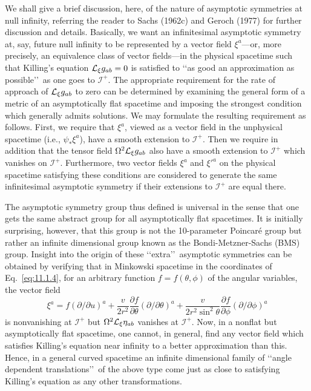 We shall give a brief discussion, here, of the nature of asymptotic symmetries at
null infinity, referring the reader to Sachs (1962c) and Geroch (1977) for further
discussion and details. Basically, we want an infinitesimal asymptotic symmetry at,
say, future null infinity to be represented by a vector field \(\xi^a\)---or, more
precisely, an equivalence class of vector fields---in the physical spacetime such that
Killing's equation \(\mathcal{L}_\xi g_{ab}=0\) is satisfied to \lq\lq as good an
approximation as possible\rq\rq\ as one goes to \(\mathcal I^+\). The appropriate
requirement for the rate of approach of \(\mathcal{L}_\xi g_{ab}\) to zero can be determined
by examining the general form of a metric of an asymptotically flat spacetime and
imposing the strongest condition which generally admits solutions. We may formulate
the resulting requirement as follows. First, we require that \(\xi^a\), viewed as a
vector field in the unphysical spacetime (i.e., \(\psi_*\xi^a\)), have a smooth
extension to \(\mathcal I^+\). Then we require in addition that the tensor field
\(\Omega^2\mathcal{L}_\xi g_{ab}\) also have a smooth extension to \(\mathcal I^+\) which
vanishes on \(\mathcal I^+\). Furthermore, two vector fields \(\xi^a\) and
\(\xi'^a\) on the physical spacetime satisfying these conditions are considered to
generate the same infinitesimal asymptotic symmetry if their extensions to
\(\mathcal I^+\) are equal there.

The asymptotic symmetry group thus defined is universal in the sense that one gets
the same abstract group for all asymptotically flat spacetimes. It is initially
surprising, however, that this group is not the 10-parameter Poincar\'e group but
rather an infinite dimensional group known as the Bondi-Metzner-Sachs (BMS) group.
Insight into the origin of these \lq\lq extra\rq\rq\ asymptotic symmetries can be obtained
by verifying that in Minkowski spacetime in the coordinates of
Eq.~\eqref{eq:11.1.4}, for an arbitrary function \(f=f(\theta,\phi)\) of the angular
variables, the vector field
\begin{equation}
  \xi^a=f(\partial/\partial u)^a
  +\frac{v}{2r^2}\frac{\partial f}{\partial\theta}(\partial/\partial\theta)^a
  +\frac{v}{2r^2\sin^2\theta}
  \frac{\partial f}{\partial\phi}(\partial/\partial\phi)^a
  \tag{11.1.25}\label{eq:11.1.25}
\end{equation}
is nonvanishing at \(\mathcal I^+\) but \(\Omega^2\mathcal{L}_\xi\eta_{ab}\) vanishes at
\(\mathcal I^+\). Now, in a nonflat but asymptotically flat spacetime, one cannot, in
general, find any vector field which satisfies Killing's equation near infinity to a
better approximation than this. Hence, in a general curved spacetime an infinite
dimensional family of \lq\lq angle dependent translations\rq\rq\ of the above type come
just as close to satisfying Killing's equation as any other transformations.


